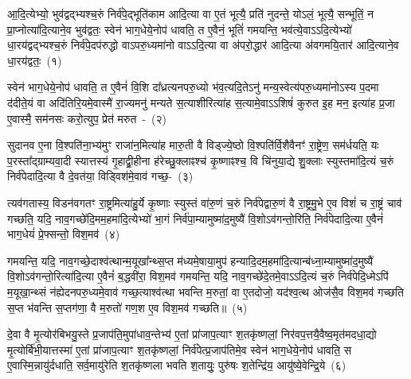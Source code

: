 \setcounter{anuvakam}{0}
आ॒दि॒त्येभ्यो॒ भुव॑द्वद्भ्यश्च॒रुं निर्व॑पे॒द्भूति॑काम आदि॒त्या वा ए॒तं भूत्यै॒ प्रति॑ नुदन्ते॒ यो\-ऽलं॒ भूत्यै॒ सन्भूतिं॒ न प्रा॒प्नोत्या॑दि॒त्याने॒व भुव॑द्वतः॒ स्वेन॑ भाग॒\-धेये॒नोप॑ धावति॒ त ए॒वैनं॒ भूतिं॑ गमयन्ति॒ भव॑त्ये॒वा\-ऽऽ\-दि॒त्येभ्यो॑ धा॒रय॑द्वद्भ्यश्च॒रुं निर्व॑पे॒दप॑रुद्धो वा\-ऽपरु॒ध्यमा॑नो वा\-ऽऽ\-दि॒त्या वा अ॑परो॒द्धार॑ आदि॒त्या अ॑वगमयि॒तार॑ आदि॒त्याने॒व धा॒रय॑द्वतः॒~(१)\ip

स्वेन॑ भाग॒\-धेये॒नोप॑ धावति॒ त ए॒वैनं॑ वि॒शि दा᳚ध्रत्यनपरु॒ध्यो भ॑व॒त्यदि॒ते\-ऽनु॑ मन्य॒स्वेत्य॑परु॒ध्यमा॑नो\-ऽस्य प॒दमा द॑दीते॒यं वा अदि॑तिरि॒यमे॒वास्मै॑ रा॒ज्यमनु॑ मन्यते स॒त्याशीरित्या॑ह स॒त्यामे॒वा\-ऽऽ\-शिषं॑ कुरुत इ॒ह मन॒ इत्या॑ह प्र॒जा ए॒वास्मै॒ सम॑नसः करो॒त्युप॒ प्रेत॑ मरुत~-~(२)\ip

सुदानव ए॒ना वि॒श्पति॑ना॒भ्य॑मुꣳ राजा॑न॒मित्या॑ह मारु॒ती वै विड्ज्ये॒ष्ठो वि॒श्पति॑र्वि॒शैवैनꣳ॑ रा॒ष्ट्रेण॒ सम॑र्धयति॒ यः प॒रस्ता᳚द्ग्राम्यवा॒दी स्यात्तस्य॑ गृ॒हाद्व्री॒हीना ह॑रेच्छु॒क्लाꣴश्च॑ कृ॒ष्णाꣴश्च॒ वि चि॑नुया॒द्ये शु॒क्लाः स्युस्तमा॑दि॒त्यं च॒रुं निर्व॑पेदादि॒त्या वै दे॒वत॑या॒ विड्विश॑मे॒वाव॑ \mbox{गच्छ॒-~(३)\ip}

त्यव॑गतास्य॒ विडन॑वगतꣳ रा॒ष्ट्रमित्या॑हु॒र्ये कृ॒ष्णाः स्युस्तं वा॑रु॒णं च॒रुं निर्व॑पेद्वारु॒णं वै रा॒ष्ट्रमु॒भे ए॒व विशं॑ च रा॒ष्ट्रं चाव॑ गच्छति॒ यदि॒ नाव॒गच्छे॑दि॒मम॒हमा॑दि॒त्येभ्यो॑ भा॒गं निर्व॑पा॒म्यामुष्मा॑द॒मुष्यै॑ वि॒शो\-ऽव॑गन्तो॒रिति॒ निर्व॑पेदादि॒त्या ए॒वैनं॑ भाग॒\-धेयं॑ प्रे॒फ्सन्तो॒ विश॒मव॑~(४)\ip

गमयन्ति॒ यदि॒ नाव॒गच्छे॒दाश्व॑त्थान्म॒यूखा᳚न्थ्स॒प्त म॑ध्यमे॒षाया॒मुप॑ हन्या\-दि॒द\-म॒हमा॑\-दि॒त्यान्ब॑ध्ना॒म्यामुष्मा॑\-द॒मुष्यै॑ वि॒शो\-ऽव॑गन्तो॒रित्या॑\-दि॒त्या ए॒वैनं॑ ब॒द्धवी॑रा॒ विश॒मव॑ गमयन्ति॒ यदि॒ नाव॒गच्छे॑दे॒तमे॒वा\-ऽऽ\-दि॒त्यं च॒रुं निर्व॑पेदि॒ध्मे\-ऽपि॑ म॒यूखा॒न्थ्सं न॑ह्येदनपरु॒ध्यमे॒वाव॑ गच्छ॒त्याश्व॑त्था भवन्ति म॒रुतां॒ वा ए॒तदोजो॒ यद॑श्व॒त्थ ओज॑सै॒व विश॒मव॑ गच्छति स॒प्त भ॑वन्ति स॒प्तग॑णा॒ वै म॒रुतो॑ गण॒श ए॒व विश॒मव॑ गच्छति॥~(५)\ip

{\anuvakamend[{धा॒रय॑द्वतो मरुतो गच्छति॒ विश॒मवै॒तद॒ष्टाद॑श च}]}

दे॒वा वै मृ॒त्योर॑बिभयु॒स्ते प्र॒जा\-प॑ति॒मुपा॑धाव॒न्तेभ्य॑ ए॒तां प्रा॑जाप॒त्याꣳ श॒तकृ॑ष्णलां॒ निर॑वप॒त्तयै॒वैष्व॒मृत॑मदधा॒द्यो मृ॒त्योर्बि॑भी॒यात्तस्मा॑ ए॒तां प्रा॑जाप॒त्याꣳ श॒तकृ॑ष्णलां॒ निर्व॑पेत्प्र॒जा\-प॑तिमे॒व स्वेन॑ भाग॒\-धेये॒नोप॑ धावति॒ स ए॒वास्मि॒न्नायु॑र्दधाति॒ सर्व॒मायु॑रेति श॒तकृ॑ष्णला भवति श॒तायुः॒ पुरु॑षः श॒तेन्द्रि॑य॒ आयु॑ष्ये॒वेन्द्रि॒ये~(६)\ip

